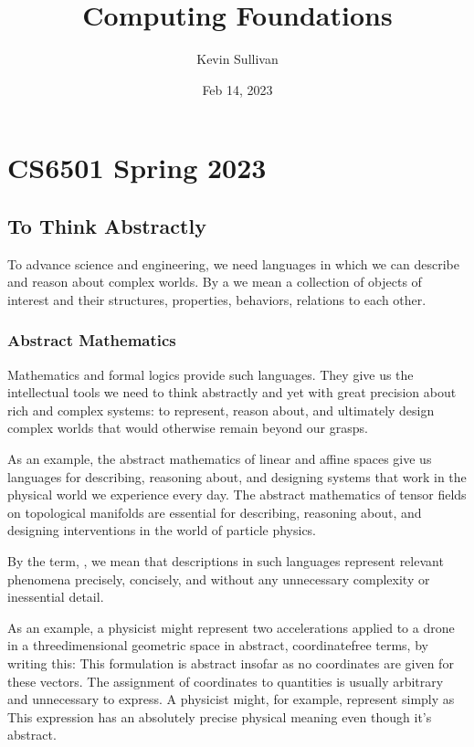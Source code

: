 \documentclass[letterpaper,10pt,english]{sphinxmanual}
\title{Computing Foundations}
\date{Feb 14, 2023}
\author{Kevin Sullivan}
\begin{document}
\pagestyle{empty}
\sphinxmaketitle
\pagestyle{plain}
\sphinxtableofcontents
\pagestyle{normal}
\label{\detokenize{index::doc}}


\sphinxstepscope


\chapter{CS6501 Spring 2023}
\label{\detokenize{A_00_Introduction:cs6501-spring-2023}}\label{\detokenize{A_00_Introduction:introduction}}\label{\detokenize{A_00_Introduction::doc}}

\section{To Think Abstractly}
\label{\detokenize{A_00_Introduction:to-think-abstractly}}
\sphinxAtStartPar
To advance science and engineering, we need languages in
which we can describe and reason about complex worlds. By
a  we mean a collection of objects of interest and
their structures, properties, behaviors, relations to each
other.


\subsection{Abstract Mathematics}
\label{\detokenize{A_00_Introduction:abstract-mathematics}}
\sphinxAtStartPar
Mathematics and formal logics provide such languages. They
give us the intellectual tools we need to think abstractly
and yet with great precision about rich and complex systems:
to represent, reason about, and ultimately design complex
worlds that would otherwise remain beyond our grasps.

\sphinxAtStartPar
As an example, the abstract mathematics of linear and affine
spaces give us languages for describing, reasoning about, and
designing systems that work in the  physical world
we experience every day. The abstract mathematics of tensor
fields on topological manifolds are essential for describing,
reasoning about, and designing interventions in the 
world of particle physics.

\sphinxAtStartPar
By the term, , we mean that descriptions in such
languages represent relevant phenomena precisely, concisely,
and without any unnecessary complexity or inessential detail.

\sphinxAtStartPar
As an example, a physicist might represent two accelerations
applied to a drone in a three\sphinxhyphen{}dimensional geometric space in
abstract, coordinate\sphinxhyphen{}free terms, by writing this:  This formulation is abstract
insofar as no coordinates are given for these vectors. The
assignment of coordinates to  quantities is usually
arbitrary and unnecessary to express. A physicist might, for
example, represent  simply as
 This expression has an absolutely precise physical
meaning even though it’s abstract.
\end{document}
